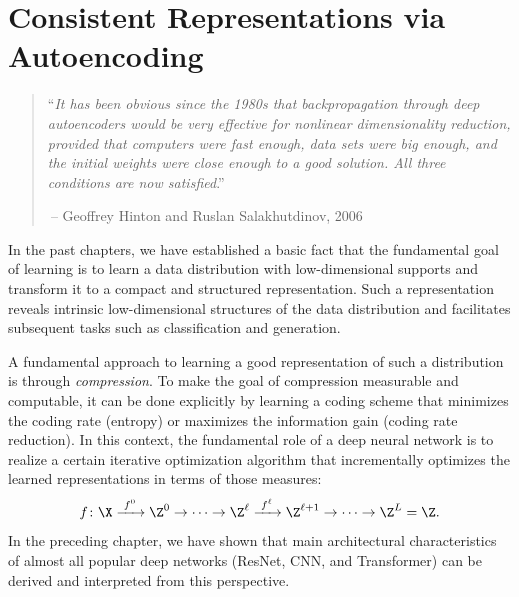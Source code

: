 \documentclass[../../book-main.tex]{subfiles}
\begin{document}
\chapter{Consistent Representations via Autoencoding}
\label{ch:consistent}\label{ch:autoencoding}

\begin{quote}
  \hfill  ``{\em It has been obvious since the 1980s that
    backpropagation through deep autoencoders would be very effective
    for nonlinear dimensionality reduction, provided that computers
    were fast enough, data sets were big enough, and the initial
    weights were close enough to a good solution. All three conditions
  are now satisfied}.''

  $~$\hfill -- Geoffrey Hinton and Ruslan  Salakhutdinov, 2006
\end{quote}

\vspace{5mm}


In the past chapters, we have established a basic fact that the
fundamental goal of learning is to learn a data
distribution with low-dimensional supports and transform it to a compact and structured
representation. Such a representation reveals intrinsic
low-dimensional structures of the data distribution and facilitates
subsequent tasks such as classification and generation.

A fundamental approach to learning a good representation of such a
distribution is through {\em compression}. To make the
goal of compression measurable and computable, it can be done
explicitly by learning a coding scheme that minimizes the coding rate (entropy) or maximizes the information gain (coding rate
reduction). In this context, the fundamental role of a deep neural
network is to realize a certain iterative optimization algorithm that
incrementally optimizes the learned representations in terms of those measures:
\begin{equation}
  f\colon \X
  \xrightarrow{\hspace{1mm} f^0 \hspace{1mm}} \Z^0 \rightarrow \cdots
  \rightarrow \Z^\ell \xrightarrow{\hspace{1mm} f^\ell \hspace{1mm}}
  \Z^{\ell+1} \rightarrow  \cdots \to \Z^L = \Z.
\end{equation}
In the preceding chapter, we have shown that main architectural
characteristics of almost all popular deep networks (ResNet, CNN, and
Transformer) can be derived and interpreted from this perspective.
\end{document}
